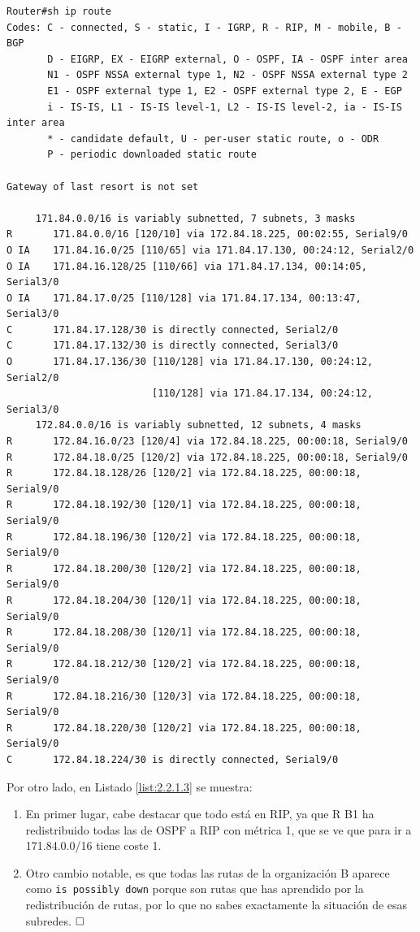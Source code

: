 \documentclass[twoside, 11pt]{article}
\begin{document}
\begin{enumerate}
\begin{center}
\begin{verbatim}
Router#sh ip route 
Codes: C - connected, S - static, I - IGRP, R - RIP, M - mobile, B - BGP
       D - EIGRP, EX - EIGRP external, O - OSPF, IA - OSPF inter area
       N1 - OSPF NSSA external type 1, N2 - OSPF NSSA external type 2
       E1 - OSPF external type 1, E2 - OSPF external type 2, E - EGP
       i - IS-IS, L1 - IS-IS level-1, L2 - IS-IS level-2, ia - IS-IS inter area
       * - candidate default, U - per-user static route, o - ODR
       P - periodic downloaded static route

Gateway of last resort is not set

     171.84.0.0/16 is variably subnetted, 7 subnets, 3 masks
R       171.84.0.0/16 [120/10] via 172.84.18.225, 00:02:55, Serial9/0
O IA    171.84.16.0/25 [110/65] via 171.84.17.130, 00:24:12, Serial2/0
O IA    171.84.16.128/25 [110/66] via 171.84.17.134, 00:14:05, Serial3/0
O IA    171.84.17.0/25 [110/128] via 171.84.17.134, 00:13:47, Serial3/0
C       171.84.17.128/30 is directly connected, Serial2/0
C       171.84.17.132/30 is directly connected, Serial3/0
O       171.84.17.136/30 [110/128] via 171.84.17.130, 00:24:12, Serial2/0
                         [110/128] via 171.84.17.134, 00:24:12, Serial3/0
     172.84.0.0/16 is variably subnetted, 12 subnets, 4 masks
R       172.84.16.0/23 [120/4] via 172.84.18.225, 00:00:18, Serial9/0
R       172.84.18.0/25 [120/2] via 172.84.18.225, 00:00:18, Serial9/0
R       172.84.18.128/26 [120/2] via 172.84.18.225, 00:00:18, Serial9/0
R       172.84.18.192/30 [120/1] via 172.84.18.225, 00:00:18, Serial9/0
R       172.84.18.196/30 [120/2] via 172.84.18.225, 00:00:18, Serial9/0
R       172.84.18.200/30 [120/2] via 172.84.18.225, 00:00:18, Serial9/0
R       172.84.18.204/30 [120/1] via 172.84.18.225, 00:00:18, Serial9/0
R       172.84.18.208/30 [120/1] via 172.84.18.225, 00:00:18, Serial9/0
R       172.84.18.212/30 [120/2] via 172.84.18.225, 00:00:18, Serial9/0
R       172.84.18.216/30 [120/3] via 172.84.18.225, 00:00:18, Serial9/0
R       172.84.18.220/30 [120/2] via 172.84.18.225, 00:00:18, Serial9/0
C       172.84.18.224/30 is directly connected, Serial9/0
\end{verbatim}
\label{list:2.2.1.2}
\end{center}

Por otro lado, en Listado \ref{list:2.2.1.3} se muestra:

\begin{enumerate}
    \item En primer lugar, cabe destacar que todo está en RIP, ya que R B1 ha redistribuido todas las de OSPF a RIP con métrica 1, que se ve que para ir a 171.84.0.0/16 tiene coste 1.
    \item Otro cambio notable, es que todas las rutas de la organización B aparece como \texttt{is possibly down} porque son rutas que has aprendido por la redistribución de rutas, por lo que no sabes exactamente la situación de esas subredes. $\hfill\square$
\end{enumerate}


\end{enumerate}
\end{document}

